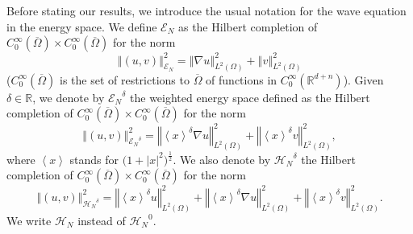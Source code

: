 \documentclass[10pt, a4paper,reqno]{amsart}
\theoremstyle{plain}
\theoremstyle{definition}
\theoremstyle{remark}
\begin{document}
Before stating our results, we introduce the usual notation for the wave equation in the energy space.
We define ${\mathscr E_N}$ as the Hilbert completion of $C_0^\infty({\overline{\Omega}}) \times C_0^\infty({\overline{\Omega}})$ for the norm 
\[
{\left\Vert {(u,v)}\right\Vert}_{\mathscr E_N}^2 = {\left\Vert {\nabla u}\right\Vert}_{L^2({\Omega})}^2 + {\left\Vert {v}\right\Vert}_{L^2({\Omega})}^2
\]
($C_0^\infty({\overline{\Omega}})$ is the set of restrictions to ${\overline{\Omega}}$ of functions in $C_0^\infty({\mathbb{R}}^{d+n})$). Given ${\delta} \in {\mathbb{R}}$, we denote by ${\mathscr E_N}^{\delta}$ the weighted energy space defined as the Hilbert completion of $C_0^\infty({\overline{\Omega}}) \times C_0^\infty({\overline{\Omega}})$ for the norm 
\[
{\left\Vert {(u,v)}\right\Vert}_{{\mathscr E_N}^{\delta}}^2 = {\left\Vert {{\left< x \right>}^{\delta} \nabla u}\right\Vert}_{L^2({\Omega})}^2 + {\left\Vert {{\left< x \right>}^{\delta} v}\right\Vert}_{L^2({\Omega})}^2,
\]
where ${\left< x \right>}$ stands for $\big( 1 + {\left\vert x\right\vert}^2 \big)^{\frac 12}$. We also denote by ${\mathcal H_N}^{\delta}$ the Hilbert completion of $C_0^\infty({\overline{\Omega}}) \times C_0^\infty({\overline{\Omega}})$ for the norm 
\[
{\left\Vert {(u,v)}\right\Vert}_{{\mathcal H_N}^{\delta}}^2 = {\left\Vert {{\left< x \right>}^{\delta} u}\right\Vert}_{L^2({\Omega})}^2 + {\left\Vert {{\left< x \right>}^{\delta} \nabla u}\right\Vert}_{L^2({\Omega})}^2 + {\left\Vert {{\left< x \right>}^{\delta} v}\right\Vert}_{L^2({\Omega})}^2.
\]
We write ${\mathcal H_N}$ instead of ${\mathcal H_N}^0$.\\
\end{document}

